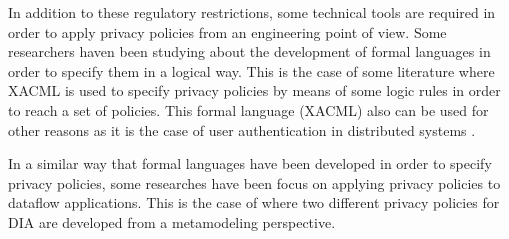 In addition to these regulatory restrictions, some technical tools are required in order to apply privacy policies from an engineering point of view. Some researchers haven been studying about the development of formal languages in order to specify them in a logical way. This is the case of some literature \cite{XACMLlanguage} where XACML is used to specify privacy policies by means of some logic rules in order to reach a set of policies. This formal language (XACML) also can be used for other reasons as it is the case of user authentication in distributed systems \cite{XACMLforAuthentication}.

In a similar way that formal languages have been developed in order to specify privacy policies, some researches have been focus on applying privacy policies to dataflow applications. This is the case of \cite{privacypoliciesarticle} where two different privacy policies for DIA are developed from a metamodeling perspective.

